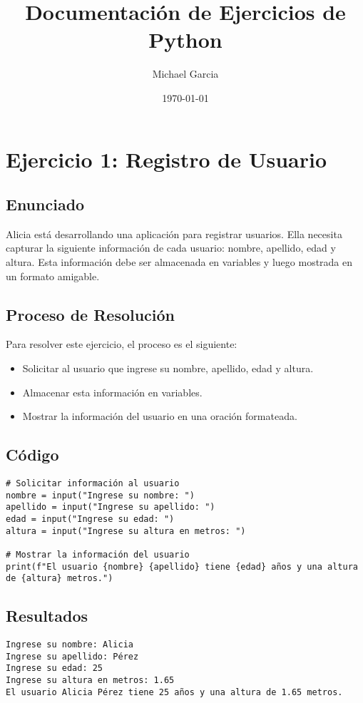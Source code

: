 \documentclass[a4paper,12pt]{article}
\title{Documentación de Ejercicios de Python}
\author{Michael Garcia}
\date{\today}
\begin{document}
\maketitle
\tableofcontents
\newpage

\section{Ejercicio 1: Registro de Usuario}

\subsection{Enunciado}
Alicia está desarrollando una aplicación para registrar usuarios. Ella necesita capturar la siguiente información de cada usuario: nombre, apellido, edad y altura. Esta información debe ser almacenada en variables y luego mostrada en un formato amigable.

\subsection{Proceso de Resolución}
Para resolver este ejercicio, el proceso es el siguiente:
\begin{itemize}
    \item Solicitar al usuario que ingrese su nombre, apellido, edad y altura.
    \item Almacenar esta información en variables.
    \item Mostrar la información del usuario en una oración formateada.
\end{itemize}

\subsection{Código}
\begin{lstlisting}
# Solicitar información al usuario
nombre = input("Ingrese su nombre: ")
apellido = input("Ingrese su apellido: ")
edad = input("Ingrese su edad: ")
altura = input("Ingrese su altura en metros: ")

# Mostrar la información del usuario
print(f"El usuario {nombre} {apellido} tiene {edad} años y una altura de {altura} metros.")
\end{lstlisting}

\subsection{Resultados}
\begin{verbatim}
Ingrese su nombre: Alicia
Ingrese su apellido: Pérez
Ingrese su edad: 25
Ingrese su altura en metros: 1.65
El usuario Alicia Pérez tiene 25 años y una altura de 1.65 metros.
\end{verbatim}
\end{document}
